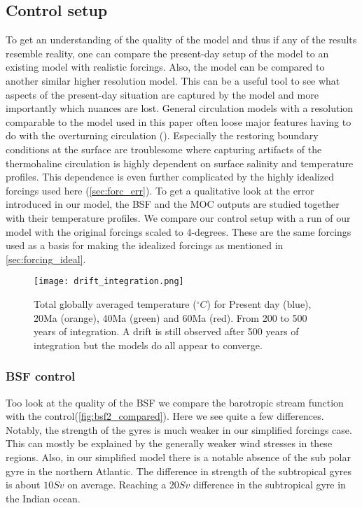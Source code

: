 \subsection{Control setup}


To get an understanding of the quality of the model and thus if any of the results resemble reality, one can compare the present-day setup of the model to an existing model with realistic forcings. Also, the model can be compared to another similar higher resolution model. This can be a useful tool to see what aspects of the present-day situation are captured by the model and more importantly which nuances are lost. General circulation models with a resolution comparable to the model used in this paper often loose major features having to do with the overturning circulation (\cite{stone1990limitations}). Especially the restoring boundary conditions at the surface are troublesome where capturing artifacts of the thermohaline circulation is highly dependent on surface salinity and temperature profiles. This dependence is even further complicated by the highly idealized forcings used here (\cref{sec:forc_err}). To get a qualitative look at the error introduced in our model, the BSF and the MOC outputs are studied together with their temperature profiles. We compare our control setup with a run of our model with the original \cite{ECMWFForc} forcings scaled to 4-degrees. These are the same forcings used as a basis for making the idealized forcings as mentioned in \cref{sec:forcing_ideal}.
\begin{figure}[H]
	\texttt{[image: drift\_integration.png]}
	\caption{Total globally averaged temperature ($^{\circ}C$) for Present day (blue), 20Ma (orange), 40Ma (green) and 60Ma (red). From 200 to 500 years of integration. A drift is still observed after 500 years of integration but the models do all appear to converge.}
	\label{fig:avtempgrph}
\end{figure}
\subsubsection{BSF control}
Too look at the quality of the BSF we compare the barotropic stream function with the control(\cref{fig:bsf2_compared}). Here we see quite a few differences. Notably, the strength of the gyres is much weaker in our simplified forcings case. This can mostly be explained by the generally weaker wind stresses in these regions. Also, in our simplified model there is a notable absence of the sub polar gyre in the northern Atlantic. The difference in strength of the subtropical gyres is about $10Sv$ on average. Reaching a $20 Sv$ difference in the subtropical gyre in the Indian ocean. 


